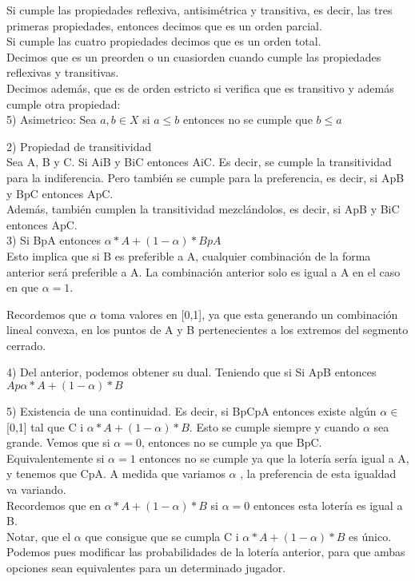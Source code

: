 \documentclass[10pt,a4paper]{book}
\begin{document}
Si cumple las propiedades reflexiva, antisimétrica y transitiva, es decir, las tres primeras propiedades, entonces decimos que es un orden parcial.\\

Si cumple las cuatro propiedades decimos que es un orden total.\\

Decimos que es un preorden o un cuasiorden cuando cumple las propiedades reflexivas y transitivas.\\

Decimos además, que es de orden estricto si verifica que es transitivo y además cumple otra propiedad:\\
\hfill 5) Asimetrico: Sea $a,b \in X$ si $a \leq b$ entonces no se cumple que $ b \leq a$


2) Propiedad de transitividad\\

Sea A, B y C. Si AiB y BiC entonces AiC. Es decir, se cumple la transitividad para la indiferencia. Pero también se cumple para la preferencia, es decir, si ApB y BpC entonces ApC.\\
Además, también cumplen la transitividad mezclándolos, es decir, si ApB y BiC entonces ApC.\\

3) Si BpA entonces $\alpha * A +(1-\alpha)* B p A$ \\
Esto implica que si B es preferible a A, cualquier combinación de la forma anterior será preferible a A. La combinación anterior solo es igual a A en el caso en que $\alpha = 1.$

Recordemos que $\alpha$ toma valores en [0,1], ya que esta generando un combinación lineal convexa, en los puntos de A y B pertenecientes a los extremos del segmento cerrado.

4) Del anterior, podemos obtener su dual. Teniendo que si Si ApB entonces $A p \alpha * A +(1-\alpha)*B$

5) Existencia de una continuidad. Es decir, si BpCpA entonces existe algún $\alpha \in$[0,1] tal que C i ${\alpha * A +(1-\alpha)* B}$. Esto se cumple siempre y cuando $\alpha$ sea grande. Vemos que si $\alpha = 0$, entonces no se cumple ya que BpC. Equivalentemente si $\alpha = 1$ entonces no se cumple ya que la lotería sería igual a A, y tenemos que CpA. A medida que variamos $\alpha$ , la preferencia de esta igualdad va variando.\\
Recordemos que en $\alpha * A +(1-\alpha)* B$ si $\alpha = 0$ entonces esta lotería es igual a B.\\ 
Notar, que el $\alpha$ que consigue que se cumpla C i ${\alpha * A +(1-\alpha)* B}$ es único.\\
Podemos pues modificar las probabilidades de la lotería anterior, para que ambas opciones sean equivalentes para un determinado jugador. 
\end{document}
